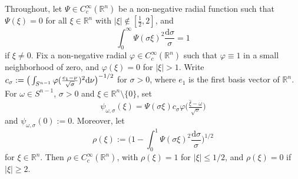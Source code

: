 \documentclass{amsart}
\newcommand {\ud}{\mathrm{d}}
\newcommand {\ph}{\varphi}
\newcommand {\Rn}{\mathbb{R}^{n}}
\newcommand {\w}{\omega}
\theoremstyle{definition}
\numberwithin{equation}{section}
\begin{document}
Throughout, let $\Psi\in C^{\infty}_{c}(\mathbb{R}^{n})$ be a non-negative radial function such that $\Psi(\xi)=0$ for all $\xi\in\Rn$ with $|\xi|\notin[\frac{1}{2},2]$, and
\begin{equation}\label{eq:Psi}
\int_{0}^{\infty}\Psi(\sigma\xi)^{2}\frac{\ud\sigma}{\sigma}=1
\end{equation}
if $\xi\neq 0$. Fix a non-negative radial $\varphi \in C_{c}^{\infty}(\mathbb{R}^{n})$ such that $\varphi\equiv 1$ in a small neighborhood of zero, and $\varphi(\xi)=0$ for $|\xi|>1$. %
Write $c_{\sigma}:=\big{(}\int_{S^{n-1}}\varphi(\frac{e_{1}-\nu}{\sqrt{\sigma}})^{2}\ud\nu\big{)}^{-1/2}$ for $\sigma>0$, where $e_{1}$ is the first basis vector of $\Rn$. %
For $\w\in S^{n-1}$, $\sigma>0$ and $\xi\in\Rn\setminus\{0\}$, set 
\[
\psi_{\w,\sigma}(\xi)=\Psi(\sigma\xi)c_{\sigma}\ph\big(\tfrac{\hat{\xi}-\w}{\sqrt{\sigma}}\big)
\]
and $\psi_{\w,\sigma}(0):=0$. %
Moreover, let
\[
\rho(\xi):=\Big(1-\int_{0}^{1}\Psi(\sigma \xi)^{2}\frac{\ud\sigma}{\sigma}\Big)^{1/2}
\]
for $\xi\in\Rn$. Then $\rho\in C^{\infty}_{c}(\Rn)$, with $\rho(\xi)=1$ for $|\xi|\leq 1/2$, and $\rho(\xi)=0$ if $|\xi|\geq 2$.
\end{document}
